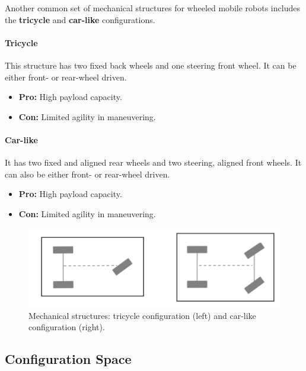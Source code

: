 Another common set of mechanical structures for wheeled mobile robots includes the \textbf{tricycle} and \textbf{car-like} configurations.

\paragraph{Tricycle} \hfill

This structure has two fixed back wheels and one steering front wheel. It can be either front- or rear-wheel driven.

\begin{itemize}
  \item \textbf{Pro:} High payload capacity.
  \item \textbf{Con:} Limited agility in maneuvering.
\end{itemize}

\paragraph{Car-like} \hfill

It has two fixed and aligned rear wheels and two steering, aligned front wheels. It can also be either front- or rear-wheel driven.

\begin{itemize}
  \item \textbf{Pro:} High payload capacity.
  \item \textbf{Con:} Limited agility in maneuvering.
\end{itemize}

\begin{figure}[H]
  \centering
  \includegraphics[width=0.85\linewidth]{imgs/tricycle_car_like.png}
  \caption{Mechanical structures: tricycle configuration (left) and car-like configuration (right).}
\end{figure}

\hfill

\subsection{Configuration Space}

